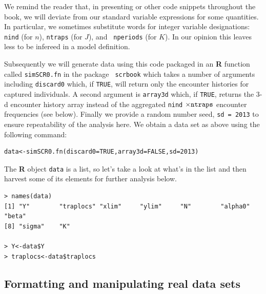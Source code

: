 We remind the reader that, in presenting \R or other code snippets
throughout the book, we will deviate from our standard variable
expressions for some quantities. 
In particular, we sometimes 
substitute words for integer variable designations:
\mbox{\tt nind} (for $n$), \mbox{\tt ntraps} (for $J$), and \mbox{\tt
 nperiods} (for $K$). In our opinion this leaves less to be infereed
 in a \bugs model definition.

Subsequently we will generate data using this code packaged in an {\bf
  R}
function called \mbox{\tt simSCR0.fn} in the package \mbox{\tt
  scrbook} which takes a number of
arguments including \mbox{\tt discard0} which, if \mbox{\tt TRUE}, will return
only the encounter histories for captured individuals.  A second
argument is \mbox{\tt array3d} which, if \mbox{\tt TRUE}, returns the 3-d
encounter history array instead of the aggregated \mbox{\tt nind}
$\times \mbox{\tt ntraps}$ encounter frequencies (see below). Finally
we provide a random number seed, \mbox{\tt sd = 2013} to ensure
repeatability of the analysis here. We obtain a data set as above using the
following command:
\begin{verbatim}
data<-simSCR0.fn(discard0=TRUE,array3d=FALSE,sd=2013)
\end{verbatim}
The {\bf R} object \mbox{\tt data} is a list, so let's take a look at
what's in the list and then harvest some of its elements for further
analysis below.
{\small
\begin{verbatim}
> names(data)
[1] "Y"        "traplocs" "xlim"     "ylim"     "N"        "alpha0"   "beta"
[8] "sigma"    "K"

> Y<-data$Y
> traplocs<-data$traplocs
\end{verbatim}
}

\subsection{Formatting and manipulating real data sets}
\label{scr0.sec.formats}

